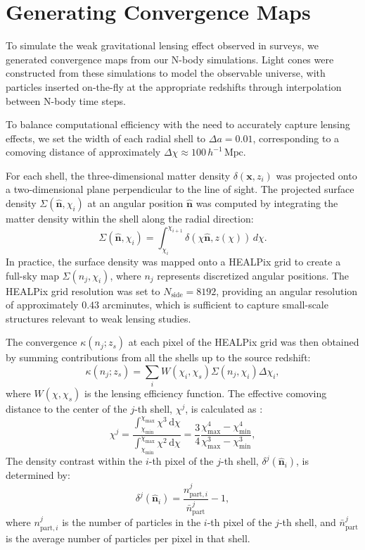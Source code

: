 \section{Generating Convergence Maps}
To simulate the weak gravitational lensing effect observed in surveys, we generated convergence maps from our N-body simulations. Light cones were constructed from these simulations to model the observable universe, with particles inserted on-the-fly at the appropriate redshifts through interpolation between N-body time steps.

To balance computational efficiency with the need to accurately capture lensing effects, we set the width of each radial shell to $\Delta a = 0.01$, corresponding to a comoving distance of approximately $\Delta \chi \approx 100 \, h^{-1} \, \text{Mpc}$.

For each shell, the three-dimensional matter density $\delta(\mathbf{x}, z_i)$ was projected onto a two-dimensional plane perpendicular to the line of sight. The projected surface density $\Sigma(\hat{\mathbf{n}}, \chi_i)$ at an angular position $\hat{\mathbf{n}}$ was computed by integrating the matter density within the shell along the radial direction:
\begin{equation}
    \Sigma(\hat{\mathbf{n}}, \chi_i) = \int_{\chi_i}^{\chi_{i+1}} \delta(\chi \hat{\mathbf{n}}, z(\chi)) \, d\chi.
\end{equation}
In practice, the surface density was mapped onto a HEALPix grid \citep{Górski_2005} to create a full-sky map $\Sigma(n_j, \chi_i)$, where $n_j$ represents discretized angular positions. The HEALPix grid resolution was set to $N_{\text{side}} = 8192$, providing an angular resolution of approximately $0.43$ arcminutes, which is sufficient to capture small-scale structures relevant to weak lensing studies.

The convergence $\kappa(n_j; z_s)$ at each pixel of the HEALPix grid was then obtained by summing contributions from all the shells up to the source redshift:
\begin{equation}
    \kappa(n_j; z_s) = \sum_{i} W(\chi_i, \chi_s) \Sigma(n_j, \chi_i) \Delta \chi_i,
\end{equation}
where $W(\chi, \chi_s)$ is the lensing efficiency function.
The effective comoving distance to the center of the $j$-th shell, $\chi^j$, is calculated as \citep{2015MNRAS.453.3043S}:
\begin{equation}
    \chi^j = \frac{\int_{\chi_{\min}}^{\chi_{\max}} \chi^3 \, \mathrm{d}\chi}{\int_{\chi_{\min}}^{\chi_{\max}} \chi^2 \, \mathrm{d}\chi} = \frac{3}{4} \frac{\chi_{\max}^4 - \chi_{\min}^4}{\chi_{\max}^3 - \chi_{\min}^3},
\end{equation}
The density contrast within the $i$-th pixel of the $j$-th shell, $\delta^j(\hat{\boldsymbol{n}}_i)$, is determined by:
\begin{equation}
    \delta^j(\hat{\boldsymbol{n}}_i) = \frac{n_{\mathrm{part}, i}^j}{\bar{n}_{\mathrm{part}}^j} - 1,
\end{equation}
where $n_{\mathrm{part}, i}^j$ is the number of particles in the $i$-th pixel of the $j$-th shell, and $\bar{n}_{\mathrm{part}}^j$ is the average number of particles per pixel in that shell.

